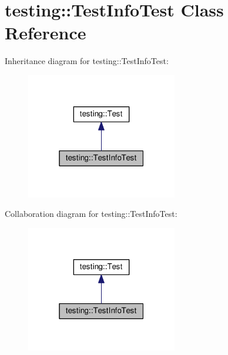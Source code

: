 \hypertarget{classtesting_1_1_test_info_test}{}\section{testing\+:\+:Test\+Info\+Test Class Reference}
\label{classtesting_1_1_test_info_test}


Inheritance diagram for testing\+:\+:Test\+Info\+Test\+:
\nopagebreak
\begin{figure}[H]
\begin{center}
\leavevmode
\includegraphics[width=187pt]{classtesting_1_1_test_info_test__inherit__graph}
\end{center}
\end{figure}


Collaboration diagram for testing\+:\+:Test\+Info\+Test\+:
\nopagebreak
\begin{figure}[H]
\begin{center}
\leavevmode
\includegraphics[width=187pt]{classtesting_1_1_test_info_test__coll__graph}
\end{center}
\end{figure}
